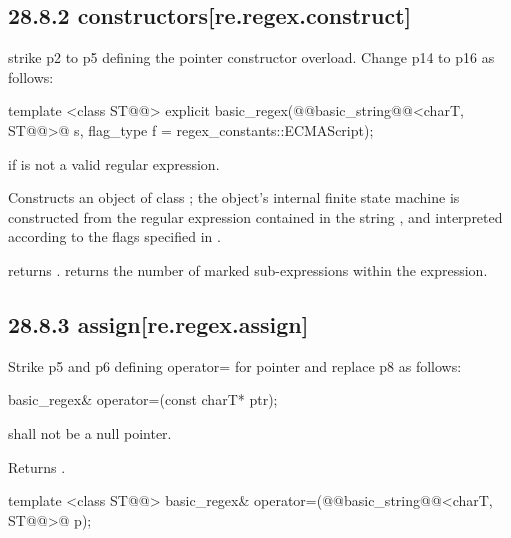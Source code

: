 \documentclass[ebook,11pt,article]{memoir}
\begin{document}
\subsection{28.8.2  constructors[re.regex.construct]}

strike p2 to p5 defining the  pointer constructor overload. 
Change p14 to p16 as follows:

\begin{itemdecl}
template <class ST@@>
  explicit basic_regex(@@basic_string@@<charT, ST@@>@\del{\&} s,
                       flag_type f = regex_constants::ECMAScript);
\end{itemdecl}

\begin{itemdescr}
\pnum
\throws  {} if  is not a valid regular expression. 

\pnum
\effects  Constructs an object of class ; the object's
internal finite state machine is constructed from the regular
expression contained in the string  , and interpreted according to the
flags specified in .

\pnum\postconditions
{} returns .  
 returns the number of marked sub-expressions
within the expression.
\end{itemdescr}

\subsection{28.8.3  assign[re.regex.assign]}
Strike p5 and p6 defining operator= for  pointer and replace p8 as follows:
\begin{removedblock}
\begin{itemdecl}
basic_regex& operator=(const charT* ptr); 
\end{itemdecl}

\begin{itemdescr}
\pnum
\requires  {} shall not be a null pointer. 

\pnum
\effects Returns .
\end{itemdescr}
\end{removedblock}

\begin{itemdecl}
template <class ST@@>
  basic_regex& operator=(@@basic_string@@<charT, ST@@>@\del{\&} p); 
\end{itemdecl}
\end{document}
